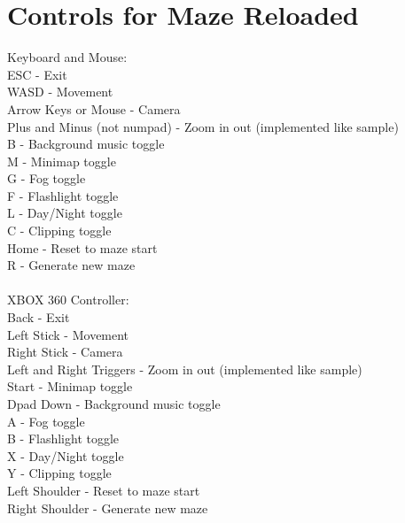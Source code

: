 \documentclass[titlepage]{article}
\begin{document}
\clearpage

\section{Controls for Maze Reloaded}
Keyboard and Mouse: \\
ESC - Exit \\
WASD - Movement \\
Arrow Keys or Mouse - Camera \\
Plus and Minus (not numpad) - Zoom in out (implemented like sample) \\
B - Background music toggle \\
M - Minimap toggle \\
G - Fog toggle \\
F - Flashlight toggle \\
L - Day/Night toggle \\
C - Clipping toggle \\
Home - Reset to maze start \\
R - Generate new maze \\
\\
XBOX 360 Controller: \\
Back - Exit \\
Left Stick - Movement \\
Right Stick - Camera \\
Left and Right Triggers - Zoom in out (implemented like sample) \\
Start - Minimap toggle \\
Dpad Down - Background music toggle \\
A - Fog toggle \\
B - Flashlight toggle \\
X - Day/Night toggle \\
Y - Clipping toggle \\
Left Shoulder - Reset to maze start \\
Right Shoulder - Generate new maze \\
\end{document}
